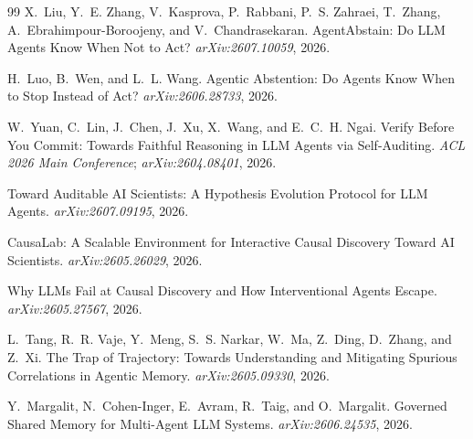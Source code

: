 \documentclass[11pt]{article}
\begin{document}
\begin{thebibliography}{99}
X.~Liu, Y.~E. Zhang, V.~Kasprova, P.~Rabbani, P.~S. Zahraei, T.~Zhang,
A.~Ebrahimpour-Boroojeny, and V.~Chandrasekaran.
\newblock AgentAbstain: Do LLM Agents Know When Not to Act?
\newblock \emph{arXiv:2607.10059}, 2026.

H.~Luo, B.~Wen, and L.~L. Wang.
\newblock Agentic Abstention: Do Agents Know When to Stop Instead of Act?
\newblock \emph{arXiv:2606.28733}, 2026.

W.~Yuan, C.~Lin, J.~Chen, J.~Xu, X.~Wang, and E.~C.~H. Ngai.
\newblock Verify Before You Commit: Towards Faithful Reasoning in LLM Agents via
Self-Auditing.
\newblock \emph{ACL 2026 Main Conference}; \emph{arXiv:2604.08401}, 2026.

Toward Auditable AI Scientists: A Hypothesis Evolution Protocol for LLM Agents.
\newblock \emph{arXiv:2607.09195}, 2026.

CausaLab: A Scalable Environment for Interactive Causal Discovery Toward AI Scientists.
\newblock \emph{arXiv:2605.26029}, 2026.

Why LLMs Fail at Causal Discovery and How Interventional Agents Escape.
\newblock \emph{arXiv:2605.27567}, 2026.

L.~Tang, R.~R. Vaje, Y.~Meng, S.~S. Narkar, W.~Ma, Z.~Ding, D.~Zhang, and Z.~Xi.
\newblock The Trap of Trajectory: Towards Understanding and Mitigating Spurious
Correlations in Agentic Memory.
\newblock \emph{arXiv:2605.09330}, 2026.

Y.~Margalit, N.~Cohen-Inger, E.~Avram, R.~Taig, and O.~Margalit.
\newblock Governed Shared Memory for Multi-Agent LLM Systems.
\newblock \emph{arXiv:2606.24535}, 2026.
\end{thebibliography}
\end{document}
